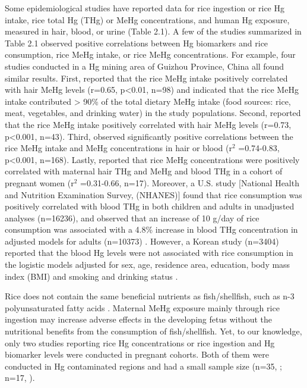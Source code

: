 Some epidemiological studies have reported data for rice ingestion or rice Hg intake, rice total Hg (THg) or MeHg concentrations, and human Hg exposure, measured in hair, blood, or urine (Table 2.1). A few of the studies summarized in Table 2.1 observed positive correlations between Hg biomarkers and rice consumption, rice MeHg intake, or rice MeHg concentrations. For example, four studies conducted in a Hg mining area of Guizhou Province, China all found similar results. First, \cite{feng2007human} reported that the rice MeHg intake positively correlated with hair MeHg levels (r=0.65, p<0.01, n=98) and indicated that the rice MeHg intake contributed > 90\% of the total dietary MeHg intake (food sources: rice, meat, vegetables, and drinking water) in the study populations. Second, \cite{li2011human} reported that the rice MeHg intake positively correlated with hair MeHg levels (r=0.73, p<0.001, n=43). Third, \cite{li2015humanbb} observed significantly positive correlations between the rice MeHg intake and MeHg concentrations in hair or blood (\(\text{r}^{2}\) =0.74-0.83, p<0.001, n=168). Lastly, \cite{rothenberg2013prenatal} reported that rice MeHg concentrations were positively correlated with maternal hair THg and MeHg and blood THg in a cohort of pregnant women (\(\text{r}^{2}\) =0.31-0.66, n=17). Moreover, a U.S. study [National Health and Nutrition Examination Survey, (NHANES)] found that rice consumption was positively correlated with blood THg in both children and adults in unadjusted analyses (n=16236), and observed that an increase of 10 g/day of rice consumption was associated with a 4.8\% increase in blood THg concentration in adjusted models for adults (n=10373) \citep{davis2014dietary}. However, a Korean study (n=3404) reported that the blood Hg levels were not associated with rice consumption in the logistic models adjusted for sex, age, residence area, education, body mass index (BMI) and smoking and drinking status \citep{park2013strong}. 

Rice does not contain the same beneficial nutrients as fish/shellfish, such as n-3 polyunsaturated fatty acids \citep{rothenberg2011low}. Maternal MeHg exposure mainly through rice ingestion may increase adverse effects in the developing fetus without the nutritional benefits from the consumption of fish/shellfish. Yet, to our knowledge, only two studies \citep{maramba2006environmental, rothenberg2013prenatal} reporting rice Hg concentrations or rice ingestion and Hg biomarker levels were conducted in pregnant cohorts. Both of them were conducted in Hg contaminated regions and had a small sample size (n=35, \cite{maramba2006environmental}; n=17, \cite{rothenberg2013prenatal}).


